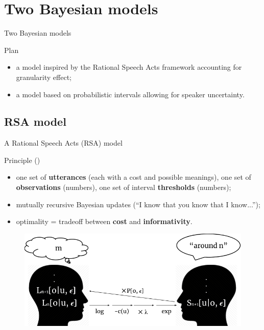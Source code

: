 \documentclass[xcolor=table, hyperref={pdfpagelabels=false}]{beamer}
\begin{document}
\section{Two Bayesian models}
\begin{frame}{}
\begin{center}
	\Huge Two Bayesian models
	\normalsize
	\begin{block}{Plan}
		\begin{itemize}
			\item a model inspired by the Rational Speech Acts framework accounting for granularity effect;
			\item a model based on probabilistic intervals allowing for speaker uncertainty.
		\end{itemize}
	\end{block}
\end{center}

\end{frame}
\subsection{RSA model}
\begin{frame}{A Rational Speech Acts (RSA) model}
\begin{block}{Principle  \small (\cite{Lassiter2013,Bergen2016})}
	\begin{itemize}
		\item one set of \textbf{utterances} (each with a cost and possible meanings), one set of \textbf{observations} (numbers), one set of interval \textbf{thresholds} (numbers); \pause
		\item mutually recursive Bayesian updates (``I know that you know that I know...''); \pause
		\item optimality = tradeoff between \textbf{cost} and \textbf{informativity}.
	\end{itemize}
\end{block}
\begin{figure}
	\includegraphics[width=.75\textwidth]{./images/rsa.png}
\end{figure}
\end{frame}
\end{document}
